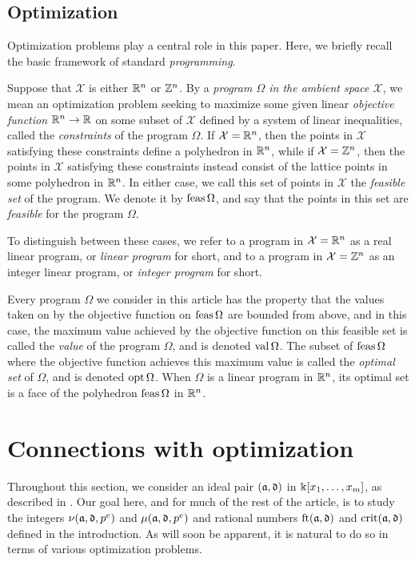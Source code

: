 \documentclass[11pt]{amsart}
\begin{document}
\subsection{Optimization}  Optimization problems play a central role in this paper.  Here, we briefly recall the basic framework of standard \emph{programming}.

Suppose that $\mathcal{X}$ is either $\mathbb{R}^n$ or $\mathbb{Z}^n$.  By a \emph{program $\Omega$ in the ambient space $\mathcal{X}$}, we mean an optimization problem seeking to maximize some given linear \emph{objective function} $\mathbb{R}^n \to \mathbb{R}$ on some subset of $\mathcal{X}$ defined by a system of linear inequalities, called the \emph{constraints} of the program $\Omega$. If $\mathcal{X} = \mathbb{R}^n$, then the points in $\mathcal{X}$ satisfying these constraints define a polyhedron in $\mathbb{R}^n$, while if $\mathcal{X} = \mathbb{Z}^n$, then the points in $\mathcal{X}$ satisfying these constraints instead consist of the lattice points in some polyhedron in $\mathbb{R}^n$.  In either case, we call this set of points in $\mathcal{X}$ the \emph{feasible set} of the program.  We denote it by $\operatorname{feas} \Omega$, and say that the points in this set are \emph{feasible} for the program $\Omega$.

To distinguish between these cases, we refer to a program in $\mathcal{X} = \mathbb{R}^n$ as a {real linear program}, or \emph{linear program} for short, and to a program in $\mathcal{X}=\mathbb{Z}^n$ as an {integer linear program}, or \emph{integer program} for short.

Every program $\Omega$ we consider in this article has the property that the values taken on by the objective function on $\operatorname{feas} \Omega$ are bounded from above, and in this case, the maximum value achieved by the objective function on this feasible set is called the \emph{value} of the program $\Omega$, and is denoted $\operatorname{val} \Omega$.  The subset of $\operatorname{feas} \Omega$ where the objective function achieves this maximum value is called the \emph{optimal set} of $\Omega$, and is denoted $\operatorname{opt} \Omega$.   When $\Omega$ is a linear program in $\mathbb{R}^n$, its optimal set is a face of the polyhedron $\operatorname{feas} \Omega$ in $\mathbb{R}^n$.


\newpage
\section{Connections with optimization}
\label{sec: LPs}
  
Throughout this section, we consider an ideal pair $(\mathfrak{a}, \mathfrak{d})$ in $\Bbbk[x_1, \ldots, x_{m}]$, as described in .   Our goal here, and for much of the rest of the article, is to study the integers $\nu(\mathfrak{a}, \mathfrak{d}, p^e)$ and $\mu(\mathfrak{a}, \mathfrak{d}, p^e)$ and rational numbers $\operatorname{ft}(\mathfrak{a}, \mathfrak{d})$ and $\operatorname{crit}(\mathfrak{a}, \mathfrak{d})$ defined in the introduction.  As will soon be apparent, it is natural to do so in terms of various optimization problems.
\end{document}
